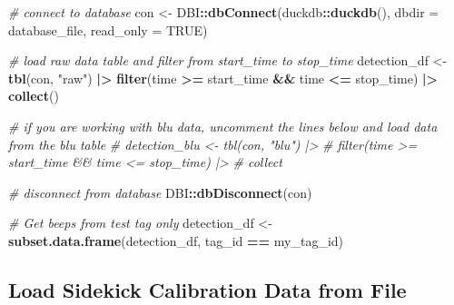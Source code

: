 \documentclass[
]{book}
\newenvironment{Shaded}{\begin{snugshade}}{\end{snugshade}}
\newcommand{\AttributeTok}[1]{\textcolor[rgb]{0.13,0.29,0.53}{#1}}
\newcommand{\CommentTok}[1]{\textcolor[rgb]{0.56,0.35,0.01}{\textit{#1}}}
\newcommand{\ConstantTok}[1]{\textcolor[rgb]{0.56,0.35,0.01}{#1}}
\newcommand{\FunctionTok}[1]{\textcolor[rgb]{0.13,0.29,0.53}{\textbf{#1}}}
\newcommand{\NormalTok}[1]{#1}
\newcommand{\OtherTok}[1]{\textcolor[rgb]{0.56,0.35,0.01}{#1}}
\newcommand{\SpecialCharTok}[1]{\textcolor[rgb]{0.81,0.36,0.00}{\textbf{#1}}}
\newcommand{\StringTok}[1]{\textcolor[rgb]{0.31,0.60,0.02}{#1}}
\begin{document}
\begin{Shaded}
\begin{Highlighting}[]
\CommentTok{\# connect to database}
\NormalTok{con }\OtherTok{\textless{}{-}}\NormalTok{ DBI}\SpecialCharTok{::}\FunctionTok{dbConnect}\NormalTok{(duckdb}\SpecialCharTok{::}\FunctionTok{duckdb}\NormalTok{(), }
                      \AttributeTok{dbdir =}\NormalTok{ database\_file, }
                      \AttributeTok{read\_only =} \ConstantTok{TRUE}\NormalTok{)}

\CommentTok{\# load raw data table and filter from start\_time to stop\_time}
\NormalTok{detection\_df }\OtherTok{\textless{}{-}} \FunctionTok{tbl}\NormalTok{(con, }\StringTok{"raw"}\NormalTok{) }\SpecialCharTok{|\textgreater{}} 
  \FunctionTok{filter}\NormalTok{(time }\SpecialCharTok{\textgreater{}=}\NormalTok{ start\_time }\SpecialCharTok{\&\&}\NormalTok{ time }\SpecialCharTok{\textless{}=}\NormalTok{ stop\_time) }\SpecialCharTok{|\textgreater{}}
  \FunctionTok{collect}\NormalTok{()}

\CommentTok{\# if you are working with blu data, uncomment the lines below and load data from the blu table}
\CommentTok{\# detection\_blu \textless{}{-} tbl(con, "blu") |\textgreater{}}
\CommentTok{\#   filter(time \textgreater{}= start\_time \&\& time \textless{}= stop\_time) |\textgreater{}}
\CommentTok{\#   collect}

\CommentTok{\# disconnect from database}
\NormalTok{DBI}\SpecialCharTok{::}\FunctionTok{dbDisconnect}\NormalTok{(con)}

\CommentTok{\# Get beeps from test tag only}
\NormalTok{detection\_df }\OtherTok{\textless{}{-}} \FunctionTok{subset.data.frame}\NormalTok{(detection\_df, }
\NormalTok{                                  tag\_id }\SpecialCharTok{==}\NormalTok{ my\_tag\_id)}
\end{Highlighting}
\end{Shaded}

\subsection{Load Sidekick Calibration Data from File}\label{load-sidekick-calibration-data-from-file}
\end{document}
